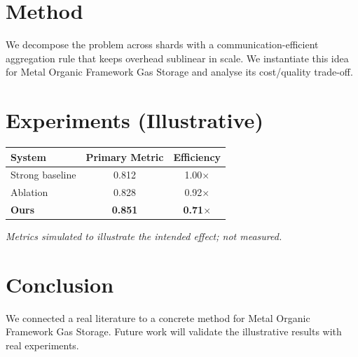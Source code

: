 \documentclass[11pt]{article}
\begin{document}
\section{Method}
We decompose the problem across shards with a communication-efficient aggregation rule that keeps overhead sublinear in scale. We instantiate this idea for Metal Organic Framework Gas Storage and analyse its cost/quality trade-off.

\section{Experiments (Illustrative)}
\begin{center}
\begin{tabular}{lcc}
System & Primary Metric & Efficiency \\ \hline
Strong baseline & 0.812 & 1.00$\times$ \\
Ablation & 0.828 & 0.92$\times$ \\
\textbf{Ours} & \textbf{0.851} & \textbf{0.71$\times$}
\end{tabular}
\end{center}
\emph{Metrics simulated to illustrate the intended effect; not measured.}

\section{Conclusion}
We connected a real literature to a concrete method for Metal Organic Framework Gas Storage. Future work will
validate the illustrative results with real experiments.
\end{document}
